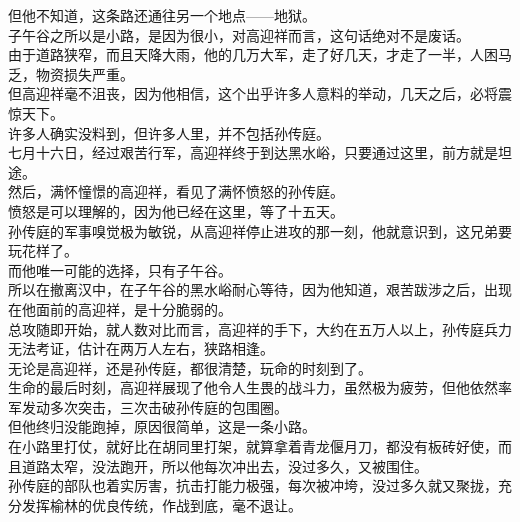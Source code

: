 \begin{multicols}{\theparacolNo}
但他不知道，这条路还通往另一个地点——地狱。\\

子午谷之所以是小路，是因为很小，对高迎祥而言，这句话绝对不是废话。\\

由于道路狭窄，而且天降大雨，他的几万大军，走了好几天，才走了一半，人困马乏，物资损失严重。\\

但高迎祥毫不沮丧，因为他相信，这个出乎许多人意料的举动，几天之后，必将震惊天下。\\

许多人确实没料到，但许多人里，并不包括孙传庭。\\

七月十六日，经过艰苦行军，高迎祥终于到达黑水峪，只要通过这里，前方就是坦途。\\

然后，满怀憧憬的高迎祥，看见了满怀愤怒的孙传庭。\\

愤怒是可以理解的，因为他已经在这里，等了十五天。\\

孙传庭的军事嗅觉极为敏锐，从高迎祥停止进攻的那一刻，他就意识到，这兄弟要玩花样了。\\

而他唯一可能的选择，只有子午谷。\\

所以在撤离汉中，在子午谷的黑水峪耐心等待，因为他知道，艰苦跋涉之后，出现在他面前的高迎祥，是十分脆弱的。\\

总攻随即开始，就人数对比而言，高迎祥的手下，大约在五万人以上，孙传庭兵力无法考证，估计在两万人左右，狭路相逢。\\

无论是高迎祥，还是孙传庭，都很清楚，玩命的时刻到了。\\

生命的最后时刻，高迎祥展现了他令人生畏的战斗力，虽然极为疲劳，但他依然率军发动多次突击，三次击破孙传庭的包围圈。\\

但他终归没能跑掉，原因很简单，这是一条小路。\\

在小路里打仗，就好比在胡同里打架，就算拿着青龙偃月刀，都没有板砖好使，而且道路太窄，没法跑开，所以他每次冲出去，没过多久，又被围住。\\

孙传庭的部队也着实厉害，抗击打能力极强，每次被冲垮，没过多久就又聚拢，充分发挥榆林的优良传统，作战到底，毫不退让。\\


\end{multicols}
